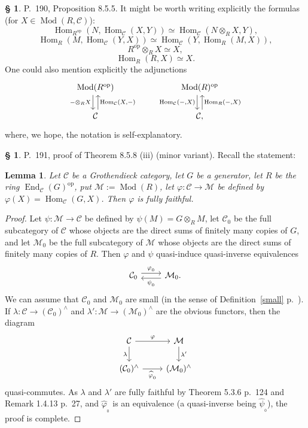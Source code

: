 \documentclass[12pt]{article}
\newtheorem{lem}[thm]{Lemma}
\theoremstyle{remark}
\theoremstyle{definition}
\newtheorem{s}[thm]{\S}
\newcommand{\C}{\mathcal C}
\newcommand{\M}{\mathcal M}
\newcommand{\mv}{ (minor variant)}
\DeclareMathOperator{\Hom}{Hom}%
\DeclareMathOperator{\Mod}{Mod}
\DeclareMathOperator{\op}{op}
\begin{document}
%
%
\begin{s} P.~190, Proposition 8.5.5. It might be worth writing explicitly the formulas (for $X\in\Mod(R,\C)$):
$$
\Hom_{R^{\op}}(N,\Hom_\C(X,Y))\simeq
\Hom_\C\left(N\otimes_RX,Y\right),
$$
$$
\Hom_R(M,\Hom_\C(Y,X))\simeq
\Hom_\C\left(Y,\Hom_R(M,X)\right),
$$
$$
R^{\op}\otimes_RX\simeq X,
$$
$$
\Hom_R(R,X)\simeq X.
$$
One could also mention explicitly the adjunctions
$$
\begin{tikzcd}
\Mod(R^{\op})\ar[xshift=-0.7ex]{d}[swap]{-\otimes_RX}&&&
\Mod(R)^{\op}\ar[xshift=-0.7ex]{d}[swap]{\Hom_\C(-,X)}\\
\C\ar[xshift=0.7ex]{u}[swap]{\Hom_\C(X,-)}&&&\C,\ar[xshift=0.7ex]{u}[swap]{\Hom_R(-,X)}
\end{tikzcd}
$$
where, we hope, the notation is self-explanatory.
\end{s}
%
%
\begin{s} P.~191, proof of Theorem 8.5.8 (iii)\mv. Recall the statement: 
%
\begin{lem}\label{858iii}
%
Let $\C$ be a Grothendieck category, let $G$ be a generator, let $R$ be the ring $\operatorname{End}_\C(G)^{\op}$, put $\M:=\Mod(R)$, let $\varphi:\C\to\M$ be defined by $\varphi(X)=\Hom_\C(G,X)$. Then $\varphi$ is fully faithful. 
%
\end{lem}
%
\begin{proof}
Let $\psi:\M\to\C$ be defined by $\psi(M)=G\otimes_RM$, let $\C_0$ be the full subcategory of $\C$ whose objects are the direct sums of finitely many copies of $G$, and let $\M_0$ be the full subcategory of $\M$ whose objects are the direct sums of finitely many copies of $R$. Then $\varphi$ and $\psi$ quasi-induce quasi-inverse equivalences 
$$
\begin{tikzcd}
\C_0\ar[yshift=.7ex]{r}{\varphi_{{}_0}}&\M_0.\ar[yshift=-.7ex]{l}{\psi_{{}_0}}
\end{tikzcd}
$$ 
We can assume that $\C_0$ and $\M_0$ are small (in the sense of Definition~\ref{small} p.~\pageref{small}). If $\lambda:\C\to(\C_0)^\wedge$ and $\lambda':\M\to(\M_0)^\wedge$ are the obvious functors, then the diagram 
$$
\begin{tikzcd}
\C\ar{r}{\varphi}\ar{d}[swap]{\lambda}&\M\ar{d}{\lambda'}\\
(\C_0)^\wedge\ar{r}[swap]{\widehat\varphi_{{}_0}}&(\M_0)^\wedge
\end{tikzcd}
$$ 
quasi-commutes. As $\lambda$ and $\lambda'$ are fully faithful by Theorem 5.3.6 p.~124 and Remark 1.4.13 p.~27, and $\widehat\varphi_{{}_0}$ is an equivalence (a quasi-inverse being $\widehat\psi_{{}_0}$), the proof is complete.
\end{proof}
\end{s}
\end{document}
